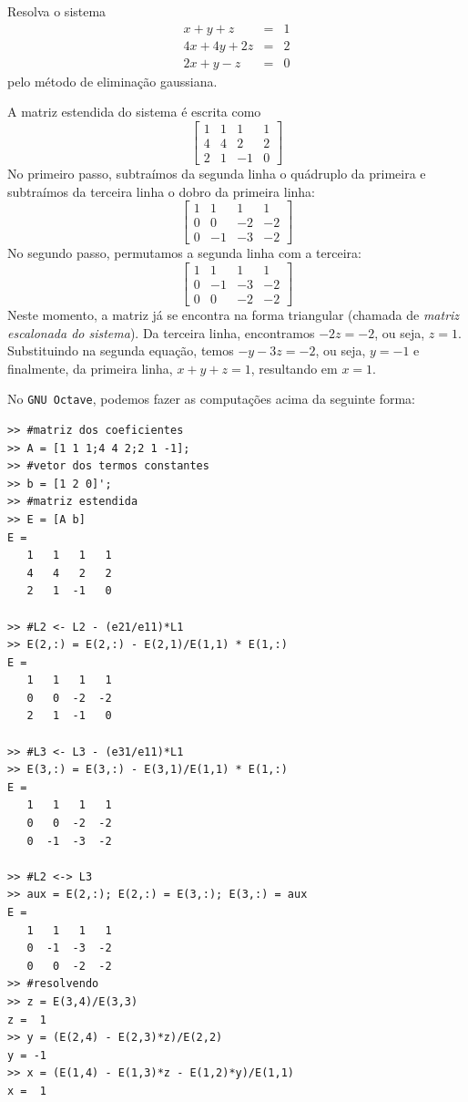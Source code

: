 \begin{ex}\label{ex:elim_gaussiana} Resolva o sistema
  \begin{eqnarray*}
    x+y+z  &=& 1\\
    4x+4y+2z&=& 2\\
    2x+y-z &=& 0
  \end{eqnarray*}
pelo método de eliminação gaussiana.
\end{ex}
\begin{sol}
A matriz estendida do sistema é escrita como
\begin{equation*}
  \begin{bmatrix}
      1 &1& 1&1\\
      4 & 4 &2&2\\
      2 &1& -1&0
  \end{bmatrix}
\end{equation*}
No primeiro passo, subtraímos da segunda linha o quádruplo da primeira e subtraímos da terceira linha o dobro da primeira linha:
\begin{equation*}
  \begin{bmatrix}
       1 &1& 1&1\\
       0 & 0 &-2&-2\\
       0 &-1& -3&-2
  \end{bmatrix}
\end{equation*}
No segundo passo, permutamos a segunda linha com a terceira:
\begin{equation*}
  \begin{bmatrix}
       1 &1& 1&1\\
       0 &-1& -3&-2\\
       0 & 0 &-2&-2
  \end{bmatrix}
\end{equation*}
Neste momento, a matriz já se encontra na forma triangular (chamada de \emph{matriz escalonada do sistema}). Da terceira linha, encontramos $-2z=-2$, ou seja, $z=1$. Substituindo na segunda equação, temos $-y-3z=-2$, ou seja, $y=-1$ e finalmente, da primeira linha, $x+y+z=1$, resultando em $x=1$.

\ifisoctave
No \verb+GNU Octave+, podemos fazer as computações acima da seguinte forma:
\begin{verbatim}
>> #matriz dos coeficientes
>> A = [1 1 1;4 4 2;2 1 -1];
>> #vetor dos termos constantes
>> b = [1 2 0]';
>> #matriz estendida
>> E = [A b]
E =
   1   1   1   1
   4   4   2   2
   2   1  -1   0

>> #L2 <- L2 - (e21/e11)*L1
>> E(2,:) = E(2,:) - E(2,1)/E(1,1) * E(1,:)
E =
   1   1   1   1
   0   0  -2  -2
   2   1  -1   0

>> #L3 <- L3 - (e31/e11)*L1
>> E(3,:) = E(3,:) - E(3,1)/E(1,1) * E(1,:)
E =
   1   1   1   1
   0   0  -2  -2
   0  -1  -3  -2

>> #L2 <-> L3
>> aux = E(2,:); E(2,:) = E(3,:); E(3,:) = aux
E =
   1   1   1   1
   0  -1  -3  -2
   0   0  -2  -2
>> #resolvendo
>> z = E(3,4)/E(3,3)
z =  1
>> y = (E(2,4) - E(2,3)*z)/E(2,2)
y = -1
>> x = (E(1,4) - E(1,3)*z - E(1,2)*y)/E(1,1)
x =  1
\end{verbatim}
\fi
\end{sol}

